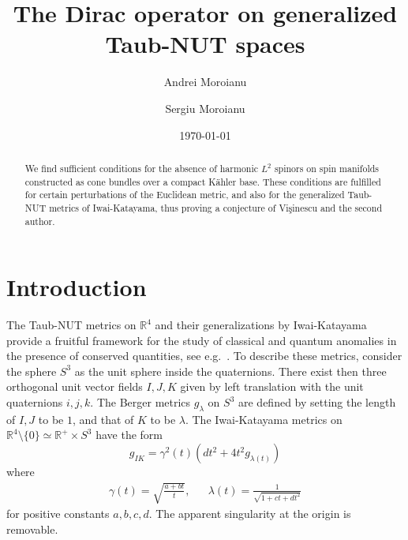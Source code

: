 \documentclass[12pt]{amsart}
\begin{document}
\newtheorem{cor}{Corollary}[section]
\newtheorem{theorem}[cor]{Theorem}
\newtheorem{prop}[cor]{Proposition}
\newtheorem{lemma}[cor]{Lemma}
\theoremstyle{definition}
\newtheorem{defi}[cor]{Definition}
\newtheorem{remark}[cor]{Remark}
\newtheorem{example}[cor]{Example}

\title{The Dirac operator on generalized Taub-NUT spaces}
\author{Andrei Moroianu}
\address{Centre de Math\'ematiques\\
\'Ecole Polytechnique\\
91128 Palaiseau Cedex\\
France}
\author{Sergiu Moroianu}
\address{Institutul de Matematic\u{a} al Academiei Rom\^{a}ne\\
P.O. Box 1-764\\RO-014700
Bu\-cha\-rest, Romania}
\address{\c Scoala Normal\u a Superioar\u a 
Bucharest, calea Grivi\c tei 21, Bucharest, Romania}
\date{\today}
\begin{abstract}
We find sufficient conditions for the absence of harmonic $L^2$ spinors
on spin manifolds constructed as cone bundles over a compact K\"ahler base.
These conditions are fulfilled for certain perturbations of the 
Euclidean metric, and also for the generalized Taub-NUT metrics 
of Iwai-Katayama, thus proving a conjecture of Vi\c sinescu and the
second author. 

\end{abstract}
\maketitle

\section{Introduction}

The Taub-NUT metrics on ${{\mathbb R}}^4$ and their generalizations by
Iwai-Katayama \cite{IK} provide a fruitful  
framework for the study of classical and quantum anomalies in the presence of
conserved quantities, see e.g.\ \cite{CV}. To describe these metrics, consider the sphere
$S^3$ as the unit sphere inside the quaternions. There exist then three 
orthogonal unit vector fields $I,J,K$ given by left translation with 
the unit quaternions $i,j,k$. The Berger metrics $g_\lambda$
on $S^3$ are defined by setting the length of $I,J$ to be $1$, and
that of $K$ to be $\lambda$. The Iwai-Katayama metrics on
${{\mathbb R}}^4\setminus\{0\}\simeq{{\mathbb R}}^+\times S^3$ have the form
\begin{equation}\label{tn}
g_{IK}=\gamma^2(t)(dt^2+4t^2 g_{\lambda(t)})
\end{equation}
where 
\begin{align*}
\gamma(t)=\sqrt{\tfrac{a+bt}{t}},&&\lambda(t)=\tfrac{1}{\sqrt{1+ct+dt^2}}
\end{align*}
for positive constants $a,b,c,d$. The apparent singularity at the origin is 
removable.
\end{document}
